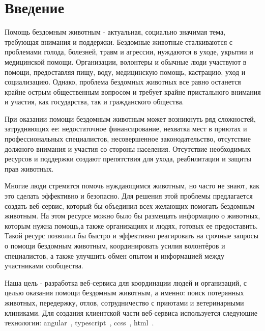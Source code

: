 
\section*{Введение}


Помощь бездомным животным - актуальная, социально значимая тема, требующая внимания и поддержки.
Бездомные животные сталкиваются с проблемами голода, болезней, травм и агрессии, нуждаются в уходе, укрытии и медицинской помощи.
Организации, волонтеры и обычные люди участвуют в помощи, предоставляя пищу, воду, медицинскую помощь, кастрацию, уход
и социализацию. Однако, проблема бездомных животных все равно останется крайне острым общественным вопросом
и требует крайне пристального внимания и участия, как государства, так и гражданского общества.

При оказании помощи бездомным животным может возникнуть ряд сложностей, затрудняющих ее: недостаточное финансирование,
нехватка мест в приютах и профессиональных специалистов, несовершенное законодательство, отсутствие должного внимания
и участия со стороны населения. Отсутствие необходимых ресурсов и поддержки создают
препятствия для ухода, реабилитации и защиты прав животных.

Многие люди стремятся помочь нуждающимся животным, но часто не знают, как это сделать эффективно и безопасно.
Для решения этой проблемы предлагается создать веб-сервис, который бы объединил всех желающих помогать бездомным
животным. На этом ресурсе можно было бы размещать информацию о животных, которым нужна помощь,а также организациях и людях,
готовых ее предоставить. Такой ресурс позволил бы быстро и эффективно реагировать на срочные запросы
о помощи бездомным животным, координировать усилия волонтёров и специалистов, а также улучшить обмен
опытом и информацией между участниками сообщества.

Наша цель - разработка веб-сервиса для координации людей и организаций, с целью оказания помощи бездомным животным, а именно:
поиск потерянных животных, передержку, отлов, сотрудничество с приютами и ветеринарными клиниками.
Для создания клиентской части веб-сервиса используется следующие технологии: angular~\cite{angularLanguage}, typescript~\cite{typescriptLanguage}, ccss~\cite{ccssLanguage}, html~\cite{htmlLanguage}.
